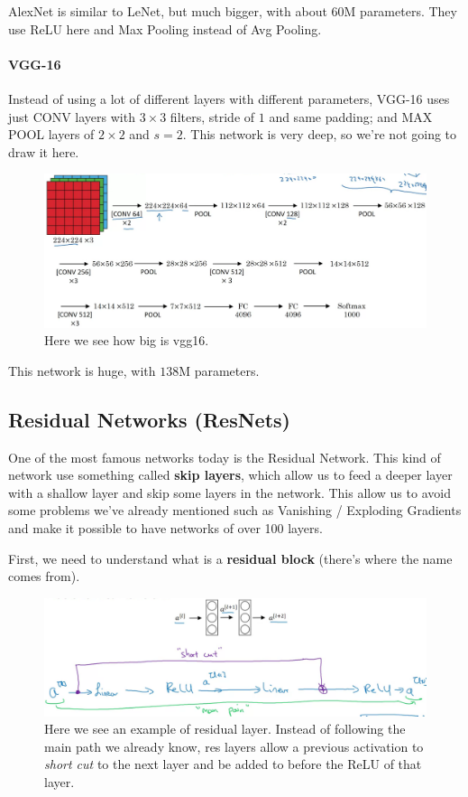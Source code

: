 \documentclass[12pt, a4paper, oneside]{book}
\begin{document}
AlexNet is similar to LeNet, but much bigger, with about $60$M parameters. They
use ReLU here and Max Pooling instead of Avg Pooling.

\paragraph{VGG-16}%
\label{par:vgg_16}

Instead of using a lot of different layers with different parameters, VGG-16
uses just CONV layers with $3\times 3$ filters, stride of $1$ and same padding;
and MAX POOL layers of $2\times 2$ and $s=2$. This network is very deep, so
we're not going to draw it here.

\begin{figure}[h]
\centering
\includegraphics[scale=0.24]{Res/vgg16.png}
\caption{Here we see how big is vgg16.}
\label{vgg16.png}
\end{figure}

This network is huge, with $138$M parameters.

\subsection{Residual Networks (ResNets)}%
\label{sub:residual_networks_resnets_}

One of the most famous networks today is the Residual Network. This kind of
network use something called \textbf{skip layers}, which allow us to feed a
deeper layer with a shallow layer and skip some layers in the network. This
allow us to avoid some problems we've already mentioned such as Vanishing /
Exploding Gradients and make it possible to have networks of over 100 layers.

First, we need to understand what is a \textbf{residual block} (there's where
the name comes from).

\begin{figure}[h]
\centering
\includegraphics[scale=0.3]{Res/residual-layers.png}
\caption{Here we see an example of residual layer. Instead of following the main
path we already know, res layers allow a previous activation to \textit{short
cut} to the next layer and be added to before the ReLU of that layer.}
\label{residual-layers.png}
\end{figure}
\end{document}
